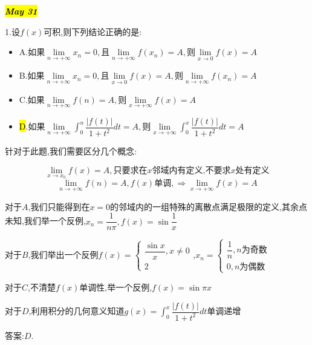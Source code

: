 
\hl{\textbf{\textit{May 31}}}

1.设$f(x)$可积,则下列结论正确的是: 
\begin{itemize}
	\item A.$\text{如果}\lim\limits_{n\rightarrow +\infty}x_{n}=0,\text{且}\lim\limits_{n\rightarrow +\infty}f(x_{n})=A,\text{则}\lim\limits_{x\rightarrow 0}f(x)=A$
	\item B.$\text{如果}\lim\limits_{n\rightarrow +\infty}x_{n}=0,\text{且}\lim\limits_{x\rightarrow 0}f(x)=A,\text{则}\lim\limits_{n\rightarrow +\infty}f(x_{n})=A$
	\item C.$\text{如果}\lim\limits_{n\rightarrow +\infty}f(n)=A,\text{则}\lim\limits_{x\rightarrow +\infty}f(x)=A$
	\item \hl{D}.$\text{如果}\lim\limits_{n\rightarrow +\infty}\int_{0}^{n}\dfrac{|f(t)|}{1+t^2}dt=A,\text{则}\lim\limits_{x\rightarrow +\infty}\int_{0}^{x}\dfrac{|f(t)|}{1+t^2}dt=A$
\end{itemize}
\begin{solution}
	
	针对于此题,我们需要区分几个概念: 
	
	$$\lim\limits_{x\rightarrow x_{0}}f(x)=A, \text{只要求在}x\text{邻域内有定义,不要求}x\text{处有定义}$$
	$$\lim\limits_{n\rightarrow+\infty}f(n)=A,f(x)\text{单调},\Rightarrow \lim\limits_{x\rightarrow+\infty}f(x)=A$$
	
	对于$A$,我们只能得到在$x=0$的邻域内的一组特殊的离散点满足极限的定义,其余点未知,我们举一个反例,$x_{n}=\dfrac{1}{n\pi},f(x)=\sin\dfrac{1}{x}$
	
	对于$B$,我们举出一个反例$f(x)=\left\lbrace 
	\begin{array}{l}
		\dfrac{\sin x}{x},x\neq 0\\
		2
	\end{array}
	\right. $,$x_{n}=\left\lbrace 
	\begin{array}{l}
		\dfrac{1}{n},n\text{为奇数}\\
		0,n\text{为偶数}
	\end{array}
	\right. $
	
	对于$C$,不清楚$f(x)$单调性,举一个反例,$f(x)=\sin \pi x$
	
	对于$D$,利用积分的几何意义知道$g(x)=\int_{0}^{x}\dfrac{|f(t)|}{1+t^2}dt$单调递增
	
	答案:$D$.
\end{solution}



